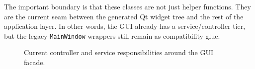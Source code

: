 The important boundary is that these classes are not just helper functions. They are the current seam between the generated Qt widget tree and the rest of the application layer. In other words, the GUI already has a service/controller tier, but the legacy \texttt{MainWindow} wrappers still remain as compatibility glue.

\begin{figure}[htbp]
\centering
\caption{Current controller and service responsibilities around the GUI facade.}
\label{fig:gui-architecture-controller-map}
\end{figure}

